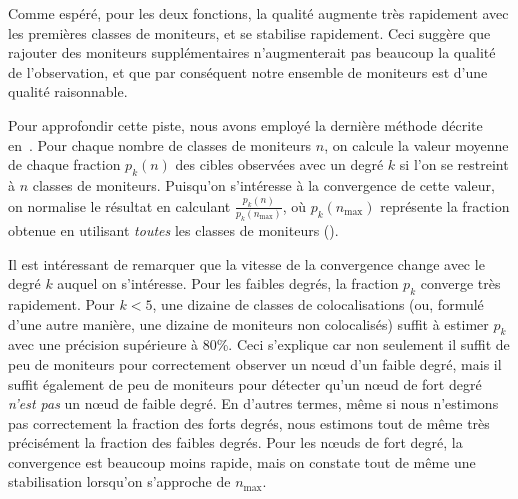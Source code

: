 
Comme espéré, pour les deux fonctions, la qualité augmente très rapidement avec
les premières classes de moniteurs, et se stabilise rapidement. Ceci suggère que
rajouter des moniteurs supplémentaires n'augmenterait pas beaucoup la qualité de
l'observation, et que par conséquent notre ensemble de moniteurs est d'une
qualité raisonnable.

Pour approfondir cette piste, nous avons employé la dernière méthode décrite
en~. Pour chaque nombre de classes de
moniteurs $n$, on calcule la valeur moyenne de chaque fraction $p_k(n)$ des
cibles observées avec un degré $k$ si l'on se restreint à $n$ classes de
moniteurs. Puisqu'on s'intéresse à la convergence de cette valeur, on normalise
le résultat en calculant $\frac{p_k(n)}{p_k(n_{\max})}$, où $p_k(n_{\max})$
représente la fraction obtenue en utilisant {\em toutes} les classes de
moniteurs ().


Il est intéressant de remarquer que la vitesse de la convergence change avec le
degré $k$ auquel on s'intéresse. Pour les faibles degrés, la fraction $p_k$
converge très rapidement. Pour $k < 5$, une dizaine de classes de
colocalisations (ou, formulé d'une autre manière, une dizaine de moniteurs non
colocalisés) suffit à estimer $p_k$ avec une précision supérieure à 80\%. Ceci
s'explique car non seulement il suffit de peu de moniteurs pour correctement
observer un n\oe{}ud d'un faible degré, mais il suffit également de peu de
moniteurs pour détecter qu'un n\oe{}ud de fort degré {\em n'est pas} un n\oe{}ud de
faible degré. En d'autres termes, même si nous n'estimons pas correctement la
fraction des forts degrés, nous estimons tout de même très précisément la
fraction des faibles degrés. Pour les n\oe{}uds de fort degré, la convergence est
beaucoup moins rapide, mais on constate tout de même une stabilisation lorsqu'on
s'approche de $n_{\max}$.

